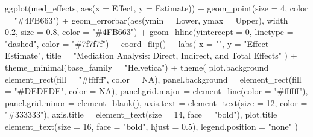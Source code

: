 \documentclass[
  letterpaper,
  DIV=11,
  numbers=noendperiod]{scrartcl}
\newenvironment{Shaded}{\begin{snugshade}}{\end{snugshade}}
\newcommand{\AttributeTok}[1]{\textcolor[rgb]{0.40,0.45,0.13}{#1}}
\newcommand{\ConstantTok}[1]{\textcolor[rgb]{0.56,0.35,0.01}{#1}}
\newcommand{\DecValTok}[1]{\textcolor[rgb]{0.68,0.00,0.00}{#1}}
\newcommand{\FloatTok}[1]{\textcolor[rgb]{0.68,0.00,0.00}{#1}}
\newcommand{\FunctionTok}[1]{\textcolor[rgb]{0.28,0.35,0.67}{#1}}
\newcommand{\NormalTok}[1]{\textcolor[rgb]{0.00,0.23,0.31}{#1}}
\newcommand{\SpecialCharTok}[1]{\textcolor[rgb]{0.37,0.37,0.37}{#1}}
\newcommand{\StringTok}[1]{\textcolor[rgb]{0.13,0.47,0.30}{#1}}
\begin{document}
\begin{Shaded}
\begin{Highlighting}[]
\FunctionTok{ggplot}\NormalTok{(med\_effects, }\FunctionTok{aes}\NormalTok{(}\AttributeTok{x =}\NormalTok{ Effect, }\AttributeTok{y =}\NormalTok{ Estimate)) }\SpecialCharTok{+}
\FunctionTok{geom\_point}\NormalTok{(}\AttributeTok{size =} \DecValTok{4}\NormalTok{, }\AttributeTok{color =} \StringTok{"\#4FB663"}\NormalTok{) }\SpecialCharTok{+}
\FunctionTok{geom\_errorbar}\NormalTok{(}\FunctionTok{aes}\NormalTok{(}\AttributeTok{ymin =}\NormalTok{ Lower, }\AttributeTok{ymax =}\NormalTok{ Upper), }\AttributeTok{width =} \FloatTok{0.2}\NormalTok{, }\AttributeTok{size =} \FloatTok{0.8}\NormalTok{, }\AttributeTok{color =} \StringTok{"\#4FB663"}\NormalTok{) }\SpecialCharTok{+}
\FunctionTok{geom\_hline}\NormalTok{(}\AttributeTok{yintercept =} \DecValTok{0}\NormalTok{, }\AttributeTok{linetype =} \StringTok{"dashed"}\NormalTok{, }\AttributeTok{color =} \StringTok{"\#7f7f7f"}\NormalTok{) }\SpecialCharTok{+}
\FunctionTok{coord\_flip}\NormalTok{() }\SpecialCharTok{+}
\FunctionTok{labs}\NormalTok{(}
\AttributeTok{x =} \StringTok{""}\NormalTok{,}
\AttributeTok{y =} \StringTok{"Effect Estimate"}\NormalTok{,}
\AttributeTok{title =} \StringTok{"Mediation Analysis: Direct, Indirect, and Total Effects"}
\NormalTok{) }\SpecialCharTok{+}
\FunctionTok{theme\_minimal}\NormalTok{(}\AttributeTok{base\_family =} \StringTok{"Helvetica"}\NormalTok{) }\SpecialCharTok{+}
\FunctionTok{theme}\NormalTok{(}
\AttributeTok{plot.background =} \FunctionTok{element\_rect}\NormalTok{(}\AttributeTok{fill =} \StringTok{"\#ffffff"}\NormalTok{, }\AttributeTok{color =} \ConstantTok{NA}\NormalTok{),}
\AttributeTok{panel.background =} \FunctionTok{element\_rect}\NormalTok{(}\AttributeTok{fill =} \StringTok{"\#DEDFDF"}\NormalTok{, }\AttributeTok{color =} \ConstantTok{NA}\NormalTok{),}
\AttributeTok{panel.grid.major =} \FunctionTok{element\_line}\NormalTok{(}\AttributeTok{color =} \StringTok{"\#ffffff"}\NormalTok{),}
\AttributeTok{panel.grid.minor =} \FunctionTok{element\_blank}\NormalTok{(),}
\AttributeTok{axis.text =} \FunctionTok{element\_text}\NormalTok{(}\AttributeTok{size =} \DecValTok{12}\NormalTok{, }\AttributeTok{color =} \StringTok{"\#333333"}\NormalTok{),}
\AttributeTok{axis.title =} \FunctionTok{element\_text}\NormalTok{(}\AttributeTok{size =} \DecValTok{14}\NormalTok{, }\AttributeTok{face =} \StringTok{"bold"}\NormalTok{),}
\AttributeTok{plot.title =} \FunctionTok{element\_text}\NormalTok{(}\AttributeTok{size =} \DecValTok{16}\NormalTok{, }\AttributeTok{face =} \StringTok{"bold"}\NormalTok{, }\AttributeTok{hjust =} \FloatTok{0.5}\NormalTok{),}
\AttributeTok{legend.position =} \StringTok{"none"}
\NormalTok{)}
\end{Highlighting}
\end{Shaded}
\end{document}
